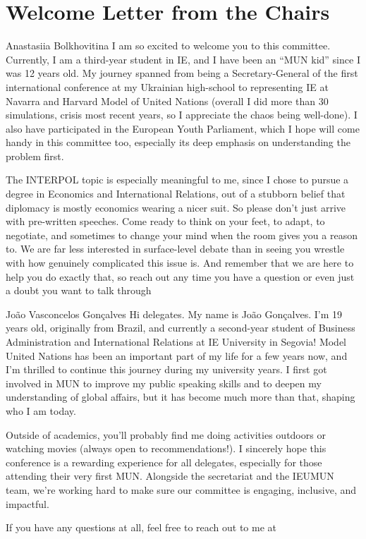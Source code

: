 \section{Welcome Letter from the Chairs}

\begin{chairletter}{Anastasiia Bolkhovitina}
I am so excited to welcome you to this committee. Currently, I am a third-year student in IE, and I have been an “MUN kid” since I was 12 years old. My journey spanned from being a Secretary-General of the first international conference at my Ukrainian high-school to representing IE at Navarra and Harvard Model of United Nations (overall I did more than 30 simulations, crisis most recent years, so I appreciate the chaos being well-done). I also have participated in the European Youth Parliament, which I hope will come handy in this committee too, especially its deep emphasis on understanding the problem first.

The INTERPOL topic is especially meaningful to me, since I chose to pursue a degree in Economics and International Relations, out of a stubborn belief that diplomacy is mostly economics wearing a nicer suit. So please don't just arrive with pre-written speeches. Come ready to think on your feet, to adapt, to negotiate, and sometimes to change your mind when the room gives you a reason to. We are far less interested in surface-level debate than in seeing you wrestle with how genuinely complicated this issue is. And remember that we are here to help you do exactly that, so reach out any time you have a question or even just a doubt you want to talk through

\end{chairletter}


\begin{chairletter}{João Vasconcelos Gonçalves}
Hi delegates. My name is João Gonçalves. I’m 19 years old, originally from Brazil, and currently a second-year student of Business Administration and International Relations at IE University in Segovia! Model United Nations has been an important part of my life for a few years now, and I’m thrilled to continue this journey during my university years. I first got involved in MUN to improve my public speaking skills and to deepen my understanding of global affairs, but it has become much more than that, shaping who I am today.

Outside of academics, you’ll probably find me doing activities outdoors or watching movies (always open to recommendations!). I sincerely hope this conference is a rewarding experience for all delegates, especially for those attending their very first MUN. Alongside the secretariat and the IEUMUN  team, we’re working hard to make sure our committee is engaging, inclusive, and impactful.

If you have any questions at all, feel free to reach out to me at 

\end{chairletter}

